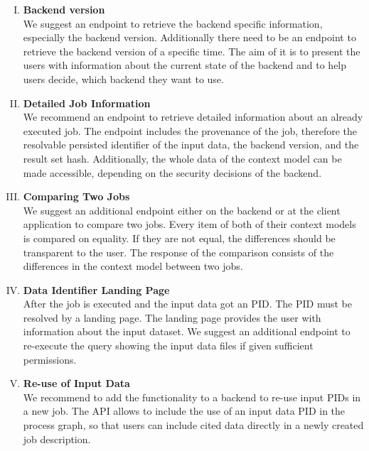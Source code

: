\documentclass[draft,final]{vutinfth} %
\begin{document}
\begin{enumerate}[I.]
\item \textbf{Backend version} \\
	We suggest an endpoint to retrieve the backend specific information, especially the backend version. Additionally there need to be an endpoint to retrieve the backend version of a specific time. The aim of it is to present the users with information about the current state of the backend and to help users decide, which backend they want to use. 

\item \textbf{Detailed Job Information} \\
	We recommend an endpoint to retrieve detailed information about an already executed job. The endpoint includes the provenance of the job, therefore the resolvable persisted identifier of the input data, the backend version, and the result set hash. Additionally, the whole data of the context model can be made accessible, depending on the security decisions of the backend.  

\item \textbf{Comparing Two Jobs} \\
	We suggest an additional endpoint either on the backend or at the client application to compare two jobs. Every item of both of their context models is compared on equality. If they are not equal, the differences should be transparent to the user. The response of the comparison consists of the differences in the context model between two jobs.

\item \textbf{Data Identifier Landing Page} \\
	After the job is executed and the input data got an PID. The PID must be resolved by a landing page. The landing page provides the user with information about the input dataset. We suggest an additional endpoint to re-execute the query showing the input data files if given sufficient permissions.
    
\item \textbf{Re-use of Input Data} \\
	We recommend to add the functionality to a backend to re-use input PIDs in a new job. The API allows to include the use of an input data PID in the process graph, so that users can include cited data directly in a newly created job description.   
\end{enumerate}
\end{document}
